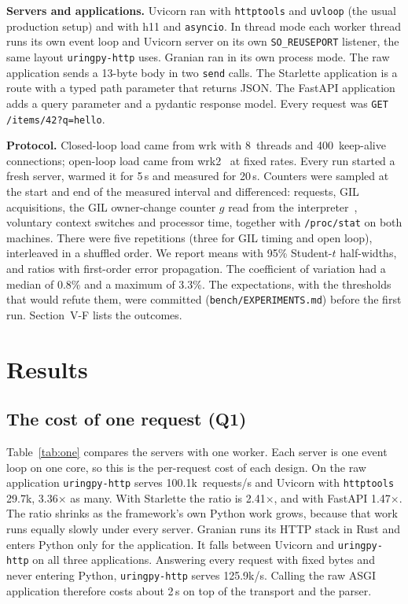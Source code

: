 \documentclass[10pt,twocolumn,letterpaper]{article}
\newcommand{\code}[1]{\texttt{#1}}
\newcommand{\kx}{$\times$}
\begin{document}
\textbf{Servers and applications.} Uvicorn ran with \code{httptools} and
\code{uvloop} (the usual production setup) and with h11 and
\code{asyncio}. In thread mode each worker thread runs its own event loop
and Uvicorn server on its own \code{SO\_REUSEPORT} listener, the same layout
\code{uringpy-http} uses. Granian ran in its own process mode. The raw
application sends a 13-byte body in two \code{send} calls. The Starlette
application is a route with a typed path parameter that returns JSON. The
FastAPI application adds a query parameter and a pydantic response model.
Every request was \code{GET /items/42?q=hello}.

\textbf{Protocol.} Closed-loop load came from wrk with 8~threads and
400~keep-alive connections; open-loop load came from wrk2~\cite{wrk2} at
fixed rates. Every run started a fresh server, warmed it for 5\,s and
measured for 20\,s. Counters were sampled at the start and end of the
measured interval and differenced: requests, GIL acquisitions, the GIL
owner-change counter $g$ read from the interpreter~\cite{uringpy},
voluntary context switches and processor time, together with
\code{/proc/stat} on both machines. There were five repetitions (three for
GIL timing and open loop), interleaved in a shuffled order. We report means
with 95\% Student-$t$ half-widths, and ratios with first-order error
propagation. The coefficient of variation had a median of 0.8\% and a
maximum of 3.3\%. The expectations, with the thresholds that would refute
them, were committed (\code{bench/EXPERIMENTS.md}) before the first run.
Section~V-F lists the outcomes.

\section{Results}

\subsection{The cost of one request (Q1)}

Table~\ref{tab:one} compares the servers with one worker. Each server is one
event loop on one core, so this is the per-request cost of each design. On
the raw application \code{uringpy-http} serves 100.1k~requests/s and
Uvicorn with \code{httptools} 29.7k, 3.36\kx{} as many. With Starlette the
ratio is 2.41\kx{}, and with FastAPI 1.47\kx{}. The ratio shrinks as the
framework's own Python work grows, because that work runs equally slowly
under every server. Granian runs its HTTP stack in Rust and enters Python
only for the application. It falls between Uvicorn and \code{uringpy-http}
on all three applications. Answering every request with fixed bytes and
never entering Python, \code{uringpy-http} serves 125.9k/s. Calling the raw
ASGI application therefore costs about 2\,\textmu s on top of the transport
and the parser.
\end{document}
